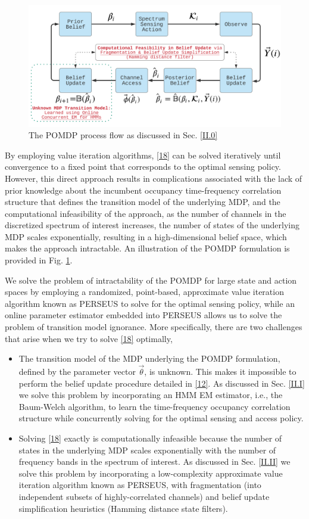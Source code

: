 \documentclass[12pt, draftcls, onecolumn]{IEEEtran}
\begin{document}
\begin{figure} [htb]
    \centerline{
    \includegraphics[width = 0.8\linewidth]{figures/Minerva_POMDP_Model.png}}
    \caption{The POMDP process flow as discussed in Sec. \ref{II.0}}
    \label{fig: A.add-1}
\end{figure}
By employing value iteration algorithms, \eqref{18} can be solved iteratively until convergence to a fixed point that corresponds to the optimal sensing policy. However, this direct approach results in complications associated with the lack of prior knowledge about the incumbent occupancy time-frequency correlation structure that defines the transition model of the underlying MDP, and the computational infeasibility of the approach, as the number of channels in the discretized spectrum of interest increases, the number of states of the underlying MDP scales exponentially, resulting in a high-dimensional belief space, which makes the approach intractable. An illustration of the POMDP formulation is provided in Fig. \ref{fig: A.add-1}.

We solve the problem of intractability of the POMDP for large state and action spaces by employing a randomized, point-based, approximate value iteration algorithm known as PERSEUS \cite{WCL:13} to solve for the optimal sensing policy, while an online parameter estimator embedded into PERSEUS allows us to solve the problem of transition model ignorance. More specifically, there are two challenges that arise when we try to solve \eqref{18} optimally,
\begin{itemize}
    \item The transition model of the MDP underlying the POMDP formulation, defined by the parameter vector $\vec{\theta}$, is unknown. This makes it impossible to perform the belief update procedure detailed in \eqref{12}. As discussed in Sec. \ref{II.I} we solve this problem by incorporating an HMM EM estimator, i.e., the Baum-Welch algorithm, to learn the time-frequency occupancy correlation structure while concurrently solving for the optimal sensing and access policy.
    \item Solving \eqref{18} exactly is computationally infeasible because the number of states in the underlying MDP scales exponentially with the number of frequency bands in the spectrum of interest. As discussed in Sec. \ref{II.II} we solve this problem by incorporating a low-complexity approximate value iteration algorithm known as PERSEUS, with fragmentation (into independent subsets of highly-correlated channels) and belief update simplification heuristics (Hamming distance state filters).
\end{itemize}
 
\end{document}
